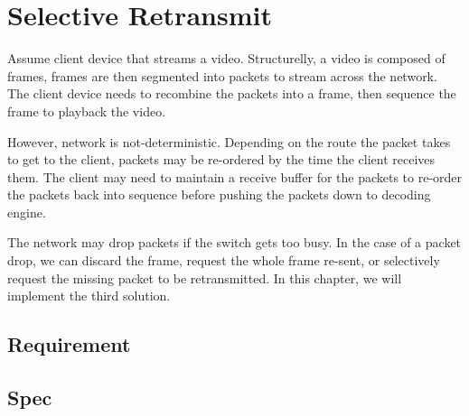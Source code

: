 \chapter{Selective Retransmit}

Assume client device that streams a video. Structurelly, a video is composed of
frames, frames are then segmented into packets to stream across the network. The
client device needs to recombine the packets into a frame, then sequence the
frame to playback the video.\newline

However, network is not-deterministic. Depending on the route the packet takes
to get to the client, packets may be re-ordered by the time the client receives
them.  The client may need to maintain a receive buffer for the packets to
re-order the packets back into sequence before pushing the packets down to
decoding engine.\newline

The network may drop packets if the switch gets too busy. In the case of a
packet drop, we can discard the frame, request the whole frame re-sent, or
selectively request the missing packet to be retransmitted. In this chapter, we
will implement the third solution.\newline

\begin{center}


\end{center}

\section{Requirement}

\section{Spec}
